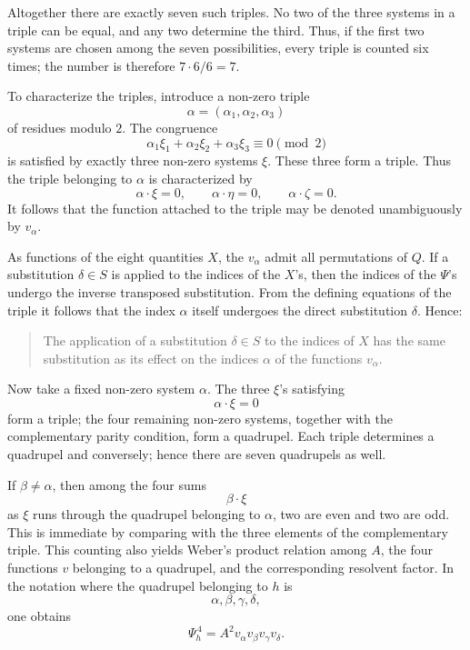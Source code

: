 \documentclass[12pt,a4paper]{article}
\begin{document}
Altogether there are exactly seven such triples.  No two of the three systems in a triple can be equal, and any two determine the third.  Thus, if the first two systems are chosen among the seven possibilities, every triple is counted six times; the number is therefore \(7\cdot6/6=7\).

To characterize the triples, introduce a non-zero triple
\[
 \alpha=(\alpha_1,\alpha_2,\alpha_3)
\]
of residues modulo \(2\).  The congruence
\[
 \alpha_1\xi_1+\alpha_2\xi_2+\alpha_3\xi_3\equiv0\pmod2
\]
is satisfied by exactly three non-zero systems \(\xi\).  These three form a triple.  Thus the triple belonging to \(\alpha\) is characterized by
\[
 \alpha\cdot\xi=0,\qquad
 \alpha\cdot\eta=0,\qquad
 \alpha\cdot\zeta=0.
\]
It follows that the function attached to the triple may be denoted unambiguously by \(v_\alpha\).

As functions of the eight quantities \(X\), the \(v_\alpha\) admit all permutations of \(Q\).  If a substitution \(\delta\in S\) is applied to the indices of the \(X\)'s, then the indices of the \(\Psi\)'s undergo the inverse transposed substitution.  From the defining equations of the triple it follows that the index \(\alpha\) itself undergoes the direct substitution \(\delta\).  Hence:

\begin{quote}
The application of a substitution \(\delta\in S\) to the indices of \(X\) has the same substitution as its effect on the indices \(\alpha\) of the functions \(v_\alpha\).
\end{quote}

Now take a fixed non-zero system \(\alpha\).  The three \(\xi\)'s satisfying
\[
 \alpha\cdot\xi=0
\]
form a triple; the four remaining non-zero systems, together with the complementary parity condition, form a quadrupel.  Each triple determines a quadrupel and conversely; hence there are seven quadrupels as well.

If \(\beta\ne\alpha\), then among the four sums
\[
 \beta\cdot\xi
\]
as \(\xi\) runs through the quadrupel belonging to \(\alpha\), two are even and two are odd.  This is immediate by comparing with the three elements of the complementary triple.  This counting also yields Weber's product relation among \(A\), the four functions \(v\) belonging to a quadrupel, and the corresponding resolvent factor.  In the notation where the quadrupel belonging to \(h\) is
\[
 \alpha,\beta,\gamma,\delta,
\]
one obtains
\[
 \Psi_h^{\,4}=A^2v_\alpha v_\beta v_\gamma v_\delta .
\]
\end{document}
